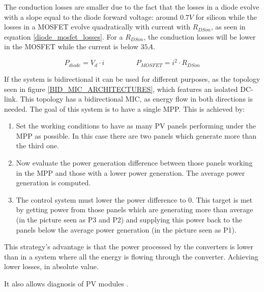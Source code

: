 The conduction losses are smaller due to the fact that the losses in a diode evolve with a slope equal to the diode forward voltage: around $0.7V$ for silicon while the losses in a MOSFET evolve quadratically with current with $R_{DSon}$, as seen in equation \ref{diode_mosfet_losses}. For a $R_{DSon}$, the conduction losses will be lower in the MOSFET while the current is below $35 A$. 

\begin{equation} \label{diode_mosfet_losses}
P_{diode} = V_d \cdot i \; \; \; \;\; \; \; \;\; \; \; \;\; \; \; \; P_{MOSFET} = i^2 \cdot R_{DSon}
\end{equation}


If the system is bidirectional it can be used for different purposes, as the topology seen in figure \ref{BID_MIC_ARCHITECTURES}, which features an isolated DC-link. This topology has a bidirectional MIC, as energy flow in both directions is needed. The goal of this system is to have a single MPP. This is achieved by:

\begin{enumerate}
	\item Set the working conditions to have as many PV  panels performing under the MPP as possible. In this case there are two panels which generate more than the third one.
	\item Now evaluate the power generation difference between those panels working in the MPP and those with a lower power generation. The average power generation is computed.
	\item The control system must lower the power difference to 0. This target is met by getting power from those panels which are generating more than average (in the picture seen as P3 and P2) and supplying this power back to the panels below the average power generation (in the picture seen as P1).
\end{enumerate}

This strategy's advantage is that the power processed by the converters is lower than in a system where all the energy is flowing through the converter. Achieving lower losses, in absolute value.


It also allows diagnosis of PV modules .

